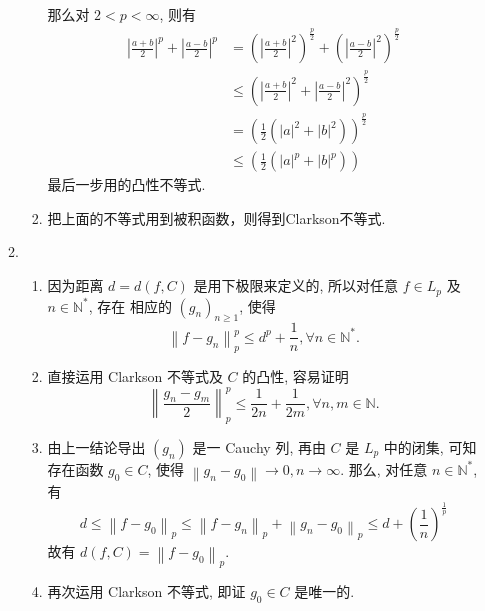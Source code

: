 \begin{enumerate}
\begin{answer}
\begin{enumerate}
\begin{enumerate}
$$                    $$
                    那么对 $2<p<\infty$, 则有
                    \[
                        \begin{aligned}
                        \left|\frac{a+b}{2}\right|^{p}+\left|\frac{a-b}{2}\right|^{p} &=\left(\left|\frac{a+b}{2}\right|^{2}\right)^{\frac{p}{2}}+\left(\left|\frac{a-b}{2}\right|^{2}\right)^{\frac{p}{2}} \\
                        & \leq\left(\left|\frac{a+b}{2}\right|^{2}+\left|\frac{a-b}{2}\right|^{2}\right)^{\frac{p}{2}} \\
                        &=\left(\frac{1}{2}(|a|^{2}+|b|^{2})\right)^{\frac{p}{2}} \\
                        & \leq \left(\frac{1}{2}(|a|^{p}+|b|^{p})\right)
                        \end{aligned}
                    \]
                    最后一步用的凸性不等式.
                    \item 把上面的不等式用到被积函数，则得到Clarkson不等式.
                \end{enumerate}
                \item \begin{enumerate}
                    \item 因为距离 $d=d(f, C)$ 是用下极限来定义的, 所以对任意 $f \in L_{p}$ 及 $n \in \mathbb{N}^{*}$, 存在 相应的 $\left(g_{n}\right)_{n \geq 1}$, 使得
                    \[
                    \left\|f-g_{n}\right\|_{p}^{p} \leq d^{p}+\frac{1}{n}, \forall n \in \mathbb{N}^{*} .
                    \]
                    \item 直接运用 Clarkson 不等式及 $C$ 的凸性, 容易证明
                    \[
                    \left\|\frac{g_{n}-g_{m}}{2}\right\|_{p}^{p} \leq \frac{1}{2 n}+\frac{1}{2 m}, \forall n, m \in \mathbb{N} .
                    \]
                    \item 由上一结论导出 $\left(g_{n}\right)$ 是一 Cauchy 列, 再由 $C$ 是 $L_{p}$ 中的闭集, 可知存在函数 $g_{0} \in C$, 使得 $\left\|g_{n}-g_{0}\right\| \rightarrow 0, n \rightarrow \infty$. 那么, 对任意 $n \in \mathbb{N}^{*}$, 有
                    \[
                    d \leq\left\|f-g_{0}\right\|_{p} \leq\left\|f-g_{n}\right\|_{p}+\left\|g_{n}-g_{0}\right\|_{p} \leq d+\left(\frac{1}{n}\right)^{\frac{1}{p}}
                    \]
                    故有 $d(f, C)=\left\|f-g_{0}\right\|_{p}$.
                    \item 再次运用 Clarkson 不等式, 即证 $g_{0} \in C$ 是唯一的.
                \end{enumerate}
            \end{enumerate}
        \end{answer}
\end{enumerate}
